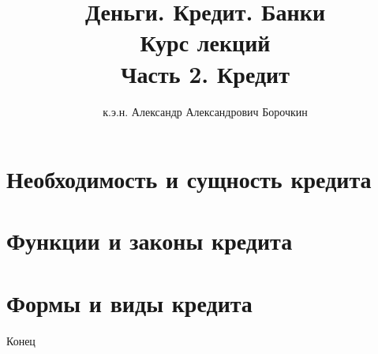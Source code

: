 \documentclass[12pt]{beamer}
\title[Деньги. Кредит. Банки.]{Деньги. Кредит. Банки\\Курс лекций\\ Часть 2. Кредит}
\author{к.э.н. Александр Александрович Борочкин}
\institute{Нижегородский государственный университет}
\date{\the\year}
\begin{document}
\begin{frame}
\titlepage
\end{frame}
\section{Необходимость и сущность кредита}


\section{Функции и законы кредита}


\section{Формы и виды кредита}



\begin{frame}
\begin{center}
\huge{Конец}
\end{center}
\end{frame}
\end{document}
